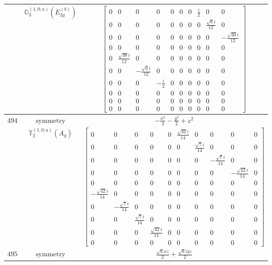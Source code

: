 \documentclass[fleqn,8pt,landscape]{jsarticle}
\begin{document}
\begin{longtable}{ccc}
$  $ & $ \mathbb{G}_{3}^{(1,0;a)}(E_{2g}^{(b)}) $ & $ \begin{bmatrix} 0 & 0 & 0 & 0 & 0 & 0 & 0 & \frac{i}{2} & 0 & 0 \\ 0 & 0 & 0 & 0 & 0 & 0 & 0 & 0 & \frac{\sqrt{6} i}{12} & 0 \\ 0 & 0 & 0 & 0 & 0 & 0 & 0 & 0 & 0 & - \frac{\sqrt{30} i}{12} \\ 0 & 0 & 0 & 0 & 0 & 0 & 0 & 0 & 0 & 0 \\ 0 & \frac{\sqrt{30} i}{12} & 0 & 0 & 0 & 0 & 0 & 0 & 0 & 0 \\ 0 & 0 & - \frac{\sqrt{6} i}{12} & 0 & 0 & 0 & 0 & 0 & 0 & 0 \\ 0 & 0 & 0 & - \frac{i}{2} & 0 & 0 & 0 & 0 & 0 & 0 \\ 0 & 0 & 0 & 0 & 0 & 0 & 0 & 0 & 0 & 0 \\ 0 & 0 & 0 & 0 & 0 & 0 & 0 & 0 & 0 & 0 \\ 0 & 0 & 0 & 0 & 0 & 0 & 0 & 0 & 0 & 0 \end{bmatrix} $ \\ \hline
$ 494 $ & $ \text{symmetry} $ & $ - \frac{x^{2}}{2} - \frac{y^{2}}{2} + z^{2} $ \\
$  $ & $ \mathbb{T}_{2}^{(1,0;a)}(A_{g}) $ & $ \begin{bmatrix} 0 & 0 & 0 & 0 & 0 & \frac{\sqrt{42} i}{14} & 0 & 0 & 0 & 0 \\ 0 & 0 & 0 & 0 & 0 & 0 & \frac{\sqrt{7} i}{14} & 0 & 0 & 0 \\ 0 & 0 & 0 & 0 & 0 & 0 & 0 & - \frac{\sqrt{7} i}{14} & 0 & 0 \\ 0 & 0 & 0 & 0 & 0 & 0 & 0 & 0 & - \frac{\sqrt{42} i}{14} & 0 \\ 0 & 0 & 0 & 0 & 0 & 0 & 0 & 0 & 0 & 0 \\ - \frac{\sqrt{42} i}{14} & 0 & 0 & 0 & 0 & 0 & 0 & 0 & 0 & 0 \\ 0 & - \frac{\sqrt{7} i}{14} & 0 & 0 & 0 & 0 & 0 & 0 & 0 & 0 \\ 0 & 0 & \frac{\sqrt{7} i}{14} & 0 & 0 & 0 & 0 & 0 & 0 & 0 \\ 0 & 0 & 0 & \frac{\sqrt{42} i}{14} & 0 & 0 & 0 & 0 & 0 & 0 \\ 0 & 0 & 0 & 0 & 0 & 0 & 0 & 0 & 0 & 0 \end{bmatrix} $ \\ \hline
$ 495 $ & $ \text{symmetry} $ & $ \frac{\sqrt{6} x z}{2} + \frac{\sqrt{6} i y z}{2} $ \\

\end{longtable}
\end{document}

